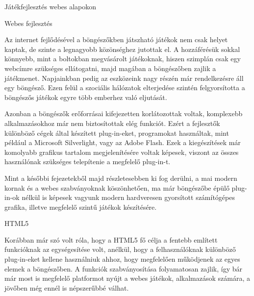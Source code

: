 \begin{MyChapter}{Játékfejlesztés webes alapokon}	

	\begin{MySection}{Webes fejlesztés}
		
		Az internet fejlődésével a böngészőkben játszható játékok nem csak helyet kaptak, de szinte a legnagyobb közönséghez jutottak el. A hozzáférésük sokkal könnyebb, mint a boltokban megvásárolt játékoknak, hiszen szimplán csak egy webcímre szükséges ellátogatni, majd magában a böngészőben zajlik a játékmenet. Napjainkban pedig az eszközeink nagy részén már rendelkezésre áll egy böngésző. Ezen felül a szociális hálózatok elterjedése szintén felgyorsította a böngészős játékok egyre több emberhez való eljutását.
		
		
		Azonban a böngészők erőforrásai kifejezetten korlátozottak voltak, komplexebb alkalmazásokhoz már nem biztosítottak elég funkciót. Ezért a fejlesztők különböző cégek által készített plug-in-eket, programokat használtak, mint például a Microsoft Silverlight, vagy az Adobe Flash. Ezek a kiegészítések már komolyabb grafikus tartalom megjelenítésére voltak képesek, viszont az összes használónak szükséges telepítenie a megfelelő plug-in-t.  
		
		Mint a későbbi fejezetekből majd részletesebben ki fog derülni, a mai modern kornak és a webes szabványoknak köszönhetően, ma már böngészőbe épülő plug-in-ok nélkül is képesek vagyunk modern hardveresen gyorsított számítógépes grafika, illetve megfelelő szintű játékok készítésére.
		
	\end{MySection}

	\begin{MySection}{HTML5}
		
		Korábban már szó volt róla, hogy a HTML5 fő célja a fentebb említett funkcióknak az egységesítése volt, anélkül, hogy a felhasználóknak különböző plug-in-eket kellene használniuk ahhoz, hogy megfelelően működjenek az egyes elemek a böngészőben.
		A funkciók szabványosítása folyamatosan zajlik, így bár már most is megfelelő platformot nyújt a webes játékok, alkalmazások számára, a jövőben még ennél is népszerűbbé válhat.
		

\end{MySection}
\end{MyChapter}
